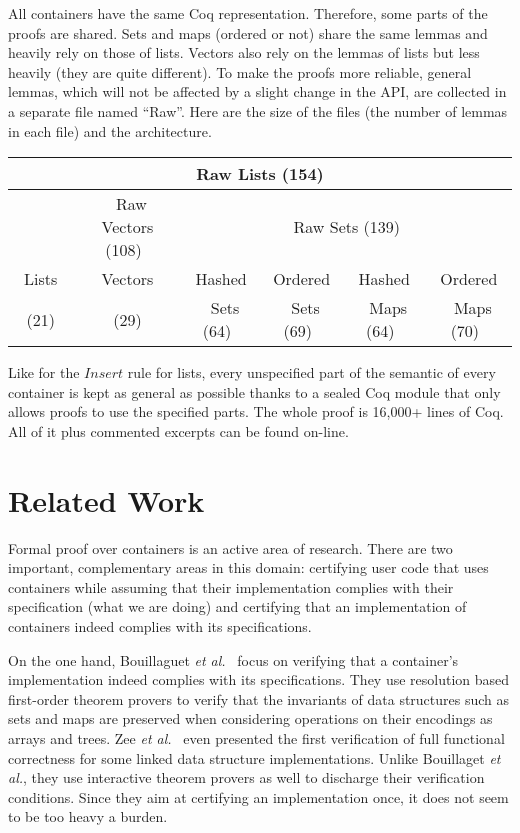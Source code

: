 \documentclass[runningheads,a4paper]{llncs}
\newcommand{\etal}{\textit{et al.}\xspace}
\newcommand{\Insert}{\ensuremath{\mathit{Insert}}\xspace}
\newcommand{\beforesec}{\vspace{-0.2cm}}
\newcommand{\aftersec}{\vspace{-0.2cm}}
\begin{document}
All containers have the same Coq representation. Therefore, some parts of the
proofs are shared. Sets and maps (ordered or not) share the same lemmas and
heavily rely on those of lists. Vectors also rely on the lemmas of lists but
less heavily (they are quite different).
To make the proofs more reliable, general lemmas, which will not be affected
by a slight change in the API, are collected in a separate file named ``Raw''.
%
Here are the size of the files
(the number of lemmas in each file) and the architecture.
\begin{center}
\begin{tabular}{|c|c|c|c|c|c|}
\hline
\multicolumn{6}{|c|}{Raw Lists (154)}\\
\hline
& ~Raw Vectors (108)~ & \multicolumn{4}{|c|}{Raw Sets (139)}\\
\cline{2-6}
~Lists~ & Vectors & Hashed & Ordered & Hashed & Ordered \\
(21) & (29) & ~Sets (64)~ & ~Sets (69)~ & ~Maps (64)~ & ~Maps (70)~\\
\hline
\end{tabular}
\end{center}
Like for the $\Insert$ rule for lists, every unspecified part of the semantic
of every container is kept as general as possible thanks to a sealed Coq module
that only allows proofs to use the specified parts. The whole proof is 16,000+
lines of Coq. All of it plus commented excerpts can be found
on-line.

\beforesec
\section{Related Work}
\label{sec:related-works}
\aftersec

Formal proof over containers is an active area of research.  There are two
important, complementary areas in this domain: certifying user code that uses
containers while assuming that their implementation complies with their
specification (what we are doing) and certifying that an implementation of
containers indeed complies with its specifications.

On the one hand, Bouillaguet \etal~\cite{bouillaguet:2007:vmcai} focus on
verifying that a container's implementation indeed complies with its
specifications. They use resolution based first-order theorem provers to verify
that the invariants of data structures such as sets and maps are preserved when
considering operations on their encodings as arrays and trees.  Zee
\etal~\cite{zee:2008:pldi} even presented the first verification of full
functional correctness for some linked data structure implementations. Unlike
Bouillaget \etal, they use interactive theorem provers as well to discharge
their verification conditions. Since they aim at certifying an implementation
once, it does not seem to be too heavy a burden.
\end{document}
